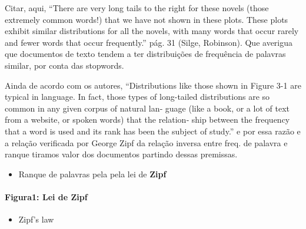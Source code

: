 \documentclass[]{article}
\newenvironment{Shaded}{\begin{snugshade}}{\end{snugshade}}
\newcommand{\KeywordTok}[1]{\textcolor[rgb]{0.13,0.29,0.53}{\textbf{#1}}}
\newcommand{\DataTypeTok}[1]{\textcolor[rgb]{0.13,0.29,0.53}{#1}}
\newcommand{\FloatTok}[1]{\textcolor[rgb]{0.00,0.00,0.81}{#1}}
\newcommand{\StringTok}[1]{\textcolor[rgb]{0.31,0.60,0.02}{#1}}
\newcommand{\CommentTok}[1]{\textcolor[rgb]{0.56,0.35,0.01}{\textit{#1}}}
\newcommand{\OtherTok}[1]{\textcolor[rgb]{0.56,0.35,0.01}{#1}}
\newcommand{\OperatorTok}[1]{\textcolor[rgb]{0.81,0.36,0.00}{\textbf{#1}}}
\newcommand{\NormalTok}[1]{#1}
\providecommand{\tightlist}{%
  \setlength{\itemsep}{0pt}\setlength{\parskip}{0pt}}
\let\oldparagraph\paragraph
\renewcommand{\paragraph}[1]{\oldparagraph{#1}\mbox{}}
\begin{document}
Citar, aqui, ``There are very long tails to the right for these novels
(those extremely common words!) that we have not shown in these plots.
These plots exhibit similar distributions for all the novels, with many
words that occur rarely and fewer words that occur frequently.'' pág. 31
(Silge, Robinson). Que averigua que documentos de texto tendem a ter
distribuições de frequência de palavras similar, por conta das
stopwords.

Ainda de acordo com os autores, ``Distributions like those shown in
Figure 3-1 are typical in language. In fact, those types of long-tailed
distributions are so common in any given corpus of natural lan‐ guage
(like a book, or a lot of text from a website, or spoken words) that the
relation‐ ship between the frequency that a word is used and its rank
has been the subject of study.'' e por essa razão e a relação verificada
por George Zipf da relação inversa entre freq. de palavra e ranque
tiramos valor dos documentos partindo dessas premissas.

\begin{itemize}
\tightlist
\item
  Ranque de palavras pela pela lei de \textbf{Zipf}
\end{itemize}

\begin{Shaded}
\end{Shaded}

\paragraph{Figura1: Lei de Zipf}\label{figura1-lei-de-zipf}

\begin{itemize}
\tightlist
\item
  Zipf's law
\end{itemize}

\begin{Shaded}
\end{Shaded}
\end{document}
